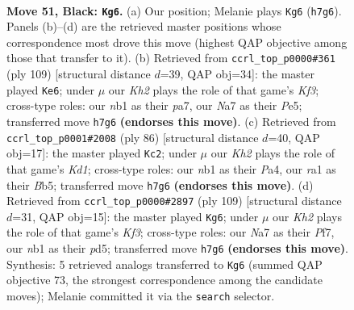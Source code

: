 \documentclass[11pt]{article}
\begin{document}
\clearpage

\begin{figure}[p]\centering
\begin{subfigure}{0.46\textwidth}\centering
\resizebox{\linewidth}{!}{%
\newchessgame
\chessboard[
  setfen={5K2/n1P4k/p7/P4p1p/4pB2/5bP1/8/RN1r4 b - - 9 51},
  showmover=false,
  pgfstyle=straightmove, color=movearrow, markmove={h7-g6}
]}
\caption{}
\end{subfigure}\hfill
\begin{subfigure}{0.46\textwidth}\centering
\resizebox{\linewidth}{!}{%
\newchessgame
\chessboard[
  setfen={r7/P2p4/2bP1k2/4p1p1/6Pp/3KB2P/R7/8 b - - 1 55},
  showmover=false,
  pgfstyle=straightmove, color=movearrow, markmove={f6-e6}
]}
\caption{}
\end{subfigure}
\\[4pt]
\begin{subfigure}{0.46\textwidth}\centering
\resizebox{\linewidth}{!}{%
\newchessgame
\chessboard[
  setfen={8/4k2p/6p1/pBn1B3/Pb2pP2/4P2P/8/3K4 w - - 19 44},
  showmover=false,
  pgfstyle=straightmove, color=movearrow, markmove={d1-c2}
]}
\caption{}
\end{subfigure}\hfill
\begin{subfigure}{0.46\textwidth}\centering
\resizebox{\linewidth}{!}{%
\newchessgame
\chessboard[
  setfen={3R4/5p2/5k1P/pB1P4/Pb4p1/6P1/3r4/5K2 b - - 0 55},
  showmover=false,
  pgfstyle=straightmove, color=movearrow, markmove={f6-g6}
]}
\caption{}
\end{subfigure}
\caption{\textbf{Move 51, Black: \texttt{Kg6}.} (a) Our position; Melanie plays \texttt{Kg6} (\texttt{h7g6}). Panels (b)--(d) are the retrieved master positions whose correspondence most drove this move (highest QAP objective among those that transfer to it). (b) Retrieved from \texttt{ccrl\_top\_p0000\#361} (ply 109) [structural distance $d$=39, QAP obj=34]: the master played \texttt{Ke6}; under $\mu$ our \emph{Kh2} plays the role of that game's \emph{Kf3}; cross-type roles: our \emph{n}b1 as their \emph{p}a7, our \emph{N}a7 as their \emph{P}e5; transferred move \texttt{h7g6} \textbf{(endorses this move)}. (c) Retrieved from \texttt{ccrl\_top\_p0001\#2008} (ply 86) [structural distance $d$=40, QAP obj=17]: the master played \texttt{Kc2}; under $\mu$ our \emph{Kh2} plays the role of that game's \emph{Kd1}; cross-type roles: our \emph{n}b1 as their \emph{P}a4, our \emph{r}a1 as their \emph{B}b5; transferred move \texttt{h7g6} \textbf{(endorses this move)}. (d) Retrieved from \texttt{ccrl\_top\_p0000\#2897} (ply 109) [structural distance $d$=31, QAP obj=15]: the master played \texttt{Kg6}; under $\mu$ our \emph{Kh2} plays the role of that game's \emph{Kf3}; cross-type roles: our \emph{N}a7 as their \emph{P}f7, our \emph{n}b1 as their \emph{p}d5; transferred move \texttt{h7g6} \textbf{(endorses this move)}. Synthesis: 5 retrieved analogs transferred to \texttt{Kg6} (summed QAP objective 73, the strongest correspondence among the candidate moves); Melanie committed it via the \texttt{search} selector.}
\label{fig:thought-m101}
\end{figure}
\end{document}
